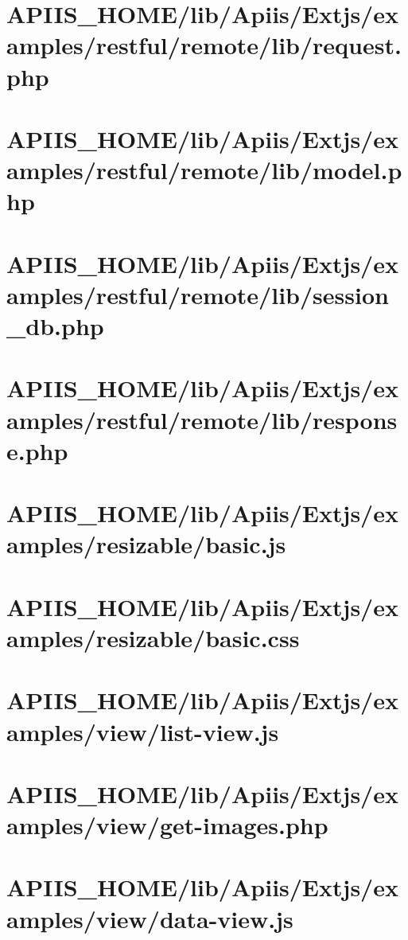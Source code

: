 \section{APIIS\_HOME/lib/Apiis/Extjs/examples/restful/remote/lib/request.php} 
\section{APIIS\_HOME/lib/Apiis/Extjs/examples/restful/remote/lib/model.php} 
\section{APIIS\_HOME/lib/Apiis/Extjs/examples/restful/remote/lib/session\_db.php} 
\section{APIIS\_HOME/lib/Apiis/Extjs/examples/restful/remote/lib/response.php} 
\section{APIIS\_HOME/lib/Apiis/Extjs/examples/resizable/basic.js} 
\section{APIIS\_HOME/lib/Apiis/Extjs/examples/resizable/basic.css} 
\section{APIIS\_HOME/lib/Apiis/Extjs/examples/view/list-view.js} 
\section{APIIS\_HOME/lib/Apiis/Extjs/examples/view/get-images.php} 
\section{APIIS\_HOME/lib/Apiis/Extjs/examples/view/data-view.js} 
